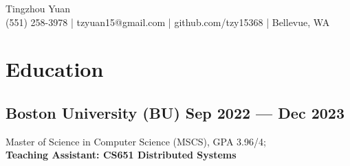 \documentclass[a4,12pt]{article}
\newcommand{\hskills}[1]{
\textbf{\bfseries #1} }
\begin{document}
 
\vspace{-0.5cm}
\begin{center}
    \begin{minipage}[b]{0.7\textwidth}
            \centering
            {\huge Tingzhou Yuan} \\ %
            \vspace{0.1cm}
           (551) 258-3978  | tzyuan15@gmail.com | github.com/tzy15368 | Bellevue, WA
    \end{minipage}%

    
\vspace{-0.35cm} 
\end{center}
\vspace{-1cm}

\section{\textbf{Education}}
\vspace{-0.2cm}
\subsection*{Boston University (BU)\hfill \textbf{ Sep 2022 --- Dec 2023 }}
Master of Science in Computer Science (MSCS), GPA 3.96/4; \\ 
\textbf{Teaching Assistant: CS651 Distributed Systems}\\


\vspace{-0.5cm}
\end{document}
